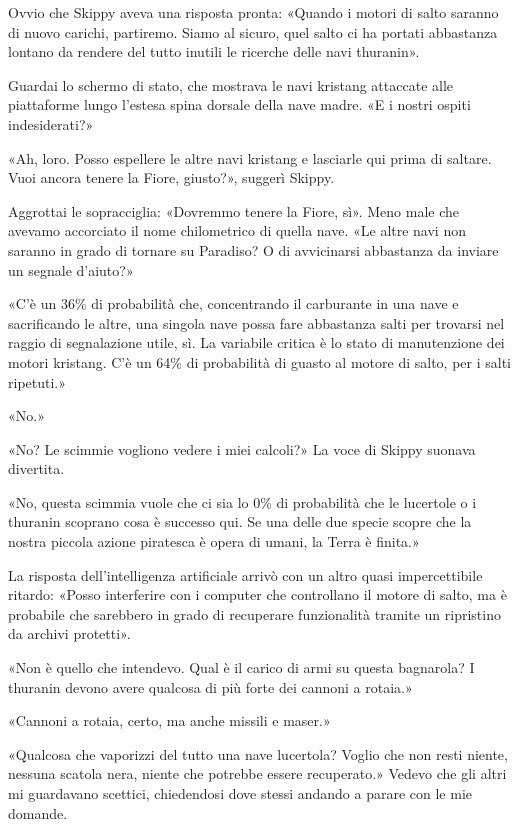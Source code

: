Ovvio che Skippy aveva una risposta pronta: «Quando i motori di salto
saranno di nuovo carichi, partiremo. Siamo al sicuro, quel salto ci ha
portati abbastanza lontano da rendere del tutto inutili le ricerche
delle navi thuranin».

Guardai lo schermo di stato, che mostrava le navi kristang attaccate
alle piattaforme lungo l'estesa spina dorsale della nave madre. «E i
nostri ospiti indesiderati?»

«Ah, loro. Posso espellere le altre navi kristang e lasciarle qui prima
di saltare. Vuoi ancora tenere la Fiore, giusto?», suggerì Skippy.

Aggrottai le sopracciglia: «Dovremmo tenere la Fiore, sì». Meno male che
avevamo accorciato il nome chilometrico di quella nave. «Le altre navi
non saranno in grado di tornare su Paradiso? O di avvicinarsi abbastanza
da inviare un segnale d'aiuto?»

«C'è un 36\% di probabilità che, concentrando il carburante in una nave
e sacrificando le altre, una singola nave possa fare abbastanza salti
per trovarsi nel raggio di segnalazione utile, sì. La variabile critica
è lo stato di manutenzione dei motori kristang. C'è un 64\% di
probabilità di guasto al motore di salto, per i salti ripetuti.»

«No.»

«No? Le scimmie vogliono vedere i miei calcoli?» La voce di Skippy
suonava divertita.

«No, questa scimmia vuole che ci sia lo 0\% di probabilità che le
lucertole o i thuranin scoprano cosa è successo qui. Se una delle due
specie scopre che la nostra piccola azione piratesca è opera di umani,
la Terra è finita.»

La risposta dell'intelligenza artificiale arrivò con un altro quasi
impercettibile ritardo: «Posso interferire con i computer che
controllano il motore di salto, ma è probabile che sarebbero in grado di
recuperare funzionalità tramite un ripristino da archivi protetti».

«Non è quello che intendevo. Qual è il carico di armi su questa
bagnarola? I thuranin devono avere qualcosa di più forte dei cannoni a
rotaia.»

«Cannoni a rotaia, certo, ma anche missili e maser.»

«Qualcosa che vaporizzi del tutto una nave lucertola? Voglio che non
resti niente, nessuna scatola nera, niente che potrebbe essere
recuperato.» Vedevo che gli altri mi guardavano scettici, chiedendosi
dove stessi andando a parare con le mie domande.

